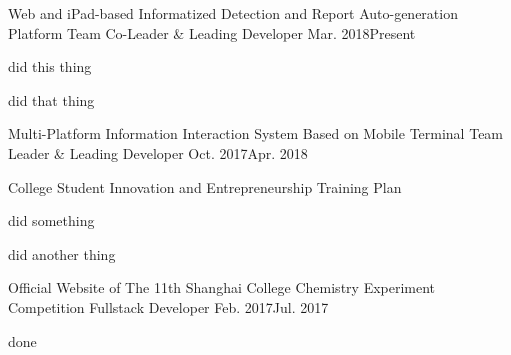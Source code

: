 
\begin{projitem}
    {Web and iPad-based Informatized Detection and Report Auto-generation Platform}
    {Team Co-Leader \& Leading Developer}
    {Mar. 2018}{Present}
    \item did this thing
    \item did that thing
\end{projitem}

\begin{projitem}
    {Multi-Platform Information Interaction System Based on Mobile Terminal}
    {Team Leader \& Leading Developer}
    {Oct. 2017}{Apr. 2018}
    \item College Student Innovation and Entrepreneurship Training Plan
    \item did something
    \item did another thing
\end{projitem}

\begin{projitem}
    {Official Website of The 11th Shanghai College Chemistry Experiment Competition}
    {Fullstack Developer}
    {Feb. 2017}{Jul. 2017}
    \item done
\end{projitem}

\endinput